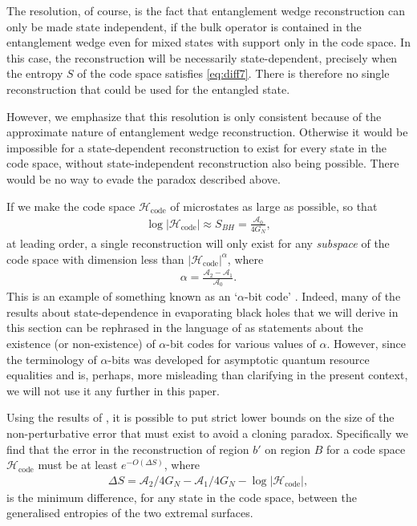 \documentclass[12pt]{article}
\begin{document}
The resolution, of course, is the fact that entanglement wedge reconstruction can only be made state independent, if the bulk operator is contained in the entanglement wedge even for mixed states with support only in the code space. In this case, the reconstruction will be necessarily state-dependent, precisely when the entropy $S$ of the code space satisfies \eqref{eq:diff7}. There is therefore no single reconstruction that could be used for the entangled state.

However, we emphasize that this resolution is only consistent because of the approximate nature of entanglement wedge reconstruction. Otherwise it would be impossible for a state-dependent reconstruction to exist for every state in the code space, without state-independent reconstruction also being possible. There would be no way to evade the paradox described above.

If we make the code space $\mathcal{H}_\text{code}$ of microstates as large as possible, so that 
\begin{align}
\log |\mathcal{H}_\text{code}| \approx S_{BH} = \frac{\mathcal{A}_0}{4 G_N},
\end{align}
at leading order,  a single reconstruction will only exist for any \emph{subspace} of the code space with dimension less than $|\mathcal{H}_\text{code}|^\alpha$, where
\begin{align}
\alpha = \frac{\mathcal{A}_2 - \mathcal{A}_1}{\mathcal{A}_0}.
\end{align}
This is an example of something known as an `$\alpha$-bit code' \cite{alphabits}. Indeed, many of the results about state-dependence in evaporating black holes that we will derive in this section can be rephrased in the language of \cite{alphabits} as statements about the existence (or non-existence) of $\alpha$-bit codes for various values of $\alpha$. However, since the terminology of $\alpha$-bits was developed for asymptotic quantum resource equalities and is, perhaps, more misleading than clarifying in the present context, we will not use it any further in this paper.

Using the results of \cite{alphabits}, it is possible to put strict lower bounds on the size of the non-perturbative error that must exist to avoid a cloning paradox. Specifically we find that the error in the reconstruction of region $b'$ on region $B$ for a code space $\mathcal{H}_\text{code}$ must be at least $e^{-O(\Delta S)}$, where 
\begin{align}
\Delta S = \mathcal{A}_2/4G_N - \mathcal{A}_1/4G_N - \log |\mathcal{H}_\text{code}|,
\end{align}
is the minimum difference, for any state in the code space, between the generalised entropies of the two extremal surfaces\cite{hayden2018learning}.
\end{document}
